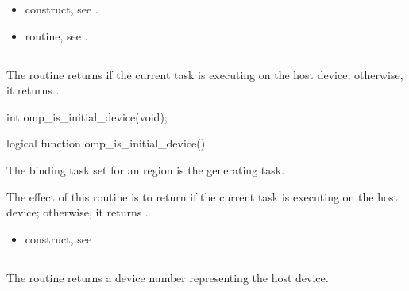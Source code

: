 \crossreferences
\begin{itemize}
\item {} construct, see
.

\item {} routine, see
.
\end{itemize}









\subsection{}
\label{subsec:omp_is_initial_device}
\summary
The  routine returns  if the current task is executing
on the host device; otherwise, it returns .

\begin{samepage}
\format
\begin{ccppspecific}
\begin{ompcFunction}
int omp_is_initial_device(void);
\end{ompcFunction}
\end{ccppspecific}
\end{samepage}

\begin{fortranspecific}
\begin{ompfFunction}
logical function omp_is_initial_device()
\end{ompfFunction}
\end{fortranspecific}

\binding
The binding task set for an  region is the generating task.

\effect
The effect of this routine is to return  if the current task is executing on the host
device; otherwise, it returns .

\crossreferences
\begin{itemize}
\item {} construct, see
\end{itemize}





\subsection{}
\label{subsec:omp_get_initial_device}
\summary
The  routine returns a device number representing
the host device.

